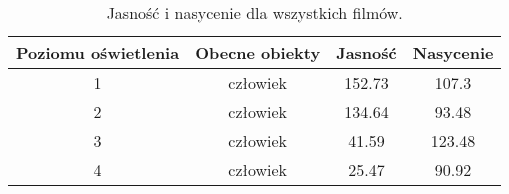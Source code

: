 \begin{table}[H]
\centering
\caption{Jasność i nasycenie dla wszystkich filmów.}
\begin{tabular}{|c|c|c|c|}
\hline
Poziomu oświetlenia  & Obecne obiekty & Jasność & Nasycenie \\ \hline
1        & człowiek       & 152.73  & 107.3     \\ \hline
2        & człowiek       & 134.64  & 93.48     \\ \hline
3        & człowiek       & 41.59   & 123.48    \\ \hline
4        & człowiek       & 25.47   & 90.92     \\ \hline
\end{tabular}

\label{tab:saturacja-jasnosc-czlowiek}
\end{table}